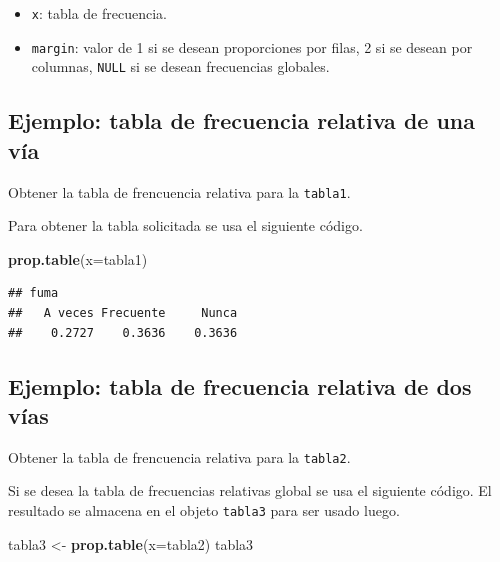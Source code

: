 \documentclass[10pt,]{krantz}
\makeatletter
\newenvironment{Shaded}{\begin{snugshade}}{\end{snugshade}}
\newcommand{\KeywordTok}[1]{\textcolor[rgb]{0.13,0.29,0.53}{\textbf{{#1}}}}
\newcommand{\DataTypeTok}[1]{\textcolor[rgb]{0.13,0.29,0.53}{{#1}}}
\newcommand{\StringTok}[1]{\textcolor[rgb]{0.31,0.60,0.02}{{#1}}}
\newcommand{\NormalTok}[1]{{#1}}
\providecommand{\tightlist}{%
  \setlength{\itemsep}{0pt}\setlength{\parskip}{0pt}}
\newenvironment{kframe}{%
\medskip{}
\setlength{\fboxsep}{.8em}
 \def\at@end@of@kframe{}%
 \ifinner\ifhmode%
  \def\at@end@of@kframe{\end{minipage}}%
  \begin{minipage}{\columnwidth}%
 \fi\fi%
 \def\FrameCommand##1{\hskip\@totalleftmargin \hskip-\fboxsep
 \colorbox{shadecolor}{##1}\hskip-\fboxsep
     \hskip-\linewidth \hskip-\@totalleftmargin \hskip\columnwidth}%
 \MakeFramed {\advance\hsize-\width
   \@totalleftmargin\z@ \linewidth\hsize
   \@setminipage}}%
 {\par\unskip\endMakeFramed%
 \at@end@of@kframe}
\renewenvironment{Shaded}{\begin{kframe}}{\end{kframe}}
\makeatother
\begin{document}
\begin{itemize}
\tightlist
\item
  \texttt{x}: tabla de frecuencia.
\item
  \texttt{margin}: valor de 1 si se desean proporciones por filas, 2 si
  se desean por columnas, \texttt{NULL} si se desean frecuencias
  globales.
\end{itemize}

\subsection*{Ejemplo: tabla de frecuencia relativa de una
vía}\label{ejemplo-tabla-de-frecuencia-relativa-de-una-via}

Obtener la tabla de frencuencia relativa para la \texttt{tabla1}.

Para obtener la tabla solicitada se usa el siguiente código.

\begin{Shaded}
\begin{Highlighting}[]
\KeywordTok{prop.table}\NormalTok{(}\DataTypeTok{x=}\NormalTok{tabla1)}
\end{Highlighting}
\end{Shaded}

\begin{verbatim}
## fuma
##   A veces Frecuente     Nunca 
##    0.2727    0.3636    0.3636
\end{verbatim}

\subsection*{Ejemplo: tabla de frecuencia relativa de dos
vías}\label{ejemplo-tabla-de-frecuencia-relativa-de-dos-vias}

Obtener la tabla de frencuencia relativa para la \texttt{tabla2}.

Si se desea la tabla de frecuencias relativas global se usa el siguiente
código. El resultado se almacena en el objeto \texttt{tabla3} para ser
usado luego.

\begin{Shaded}
\begin{Highlighting}[]
\NormalTok{tabla3 <-}\StringTok{ }\KeywordTok{prop.table}\NormalTok{(}\DataTypeTok{x=}\NormalTok{tabla2)}
\NormalTok{tabla3}
\end{Highlighting}
\end{Shaded}
\end{document}
